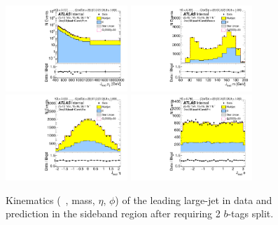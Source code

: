 \clearpage

\begin{figure}[htb!]
\begin{center}
\includegraphics[width=0.41\textwidth,angle=-90]{figures/boosted/Sideband/b77_TwoTag_split_Sideband_leadHCand_Pt_m_1.pdf}
\includegraphics[width=0.41\textwidth,angle=-90]{figures/boosted/Sideband/b77_TwoTag_split_Sideband_leadHCand_Mass_s.pdf}\\
\includegraphics[width=0.41\textwidth,angle=-90]{figures/boosted/Sideband/b77_TwoTag_split_Sideband_leadHCand_Eta.pdf}
\includegraphics[width=0.41\textwidth,angle=-90]{figures/boosted/Sideband/b77_TwoTag_split_Sideband_leadHCand_Phi.pdf}
  \caption{Kinematics (\pt~, mass, $\eta$, $\phi$) of the leading large-\R jet in data and prediction in the sideband region after requiring 2 $b$-tags split.}
  \label{fig:boosted-2bs-sideband-ak10-lead}
\end{center}
\end{figure}

